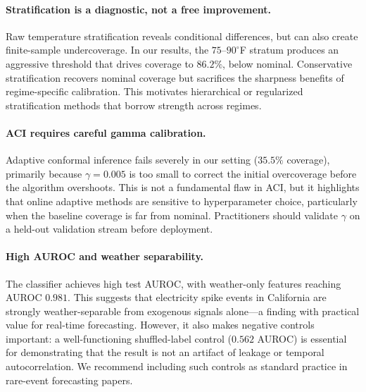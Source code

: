 \documentclass{article}
\begin{document}
\paragraph{Stratification is a diagnostic, not a free improvement.}
Raw temperature stratification reveals conditional differences, but can also
create finite-sample undercoverage. In our results, the $75$--$90^{\circ}$F
stratum produces an aggressive threshold that drives coverage to $86.2\%$,
below nominal. Conservative stratification recovers nominal coverage but
sacrifices the sharpness benefits of regime-specific calibration. This
motivates hierarchical or regularized stratification methods that borrow
strength across regimes.

\paragraph{ACI requires careful gamma calibration.}
Adaptive conformal inference fails severely in our setting ($35.5\%$ coverage),
primarily because $\gamma=0.005$ is too small to correct the initial
overcoverage before the algorithm overshoots. This is not a fundamental flaw
in ACI, but it highlights that online adaptive methods are sensitive to
hyperparameter choice, particularly when the baseline coverage is far from
nominal. Practitioners should validate $\gamma$ on a held-out validation
stream before deployment.

\paragraph{High AUROC and weather separability.}
The classifier achieves high test AUROC, with weather-only features reaching
AUROC $0.981$. This suggests that electricity spike events in California
are strongly weather-separable from exogenous signals alone---a finding with
practical value for real-time forecasting. However, it also makes negative
controls important: a well-functioning shuffled-label control ($0.562$ AUROC)
is essential for demonstrating that the result is not an artifact of leakage
or temporal autocorrelation. We recommend including such controls as standard
practice in rare-event forecasting papers.
\end{document}
